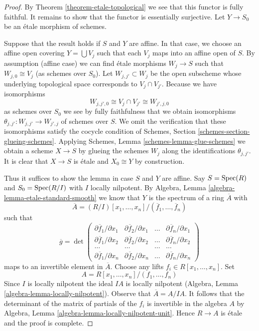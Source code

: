 \begin{proof}
By Theorem \ref{theorem-etale-topological}
we see that this functor is fully faithful.
It remains to show that the functor is essentially surjective.
Let $Y \to S_0$ be an \'etale morphism of schemes.

\medskip\noindent
Suppose that the result holds if $S$ and $Y$ are affine.
In that case, we choose an affine open covering
$Y = \bigcup V_j$ such that each $V_j$ maps
into an affine open of $S$. By assumption (affine case) we can
find \'etale morphisms $W_j \to S$ such that $W_{j, 0} \cong V_j$
(as schemes over $S_0$). Let $W_{j, j'} \subset W_j$
be the open subscheme whose underlying topological space
corresponds to $V_j \cap V_{j'}$. Because we have isomorphisms
$$
W_{j, j', 0} \cong V_j \cap V_{j'} \cong W_{j', j, 0}
$$
as schemes over $S_0$ we see by fully faithfulness that we
obtain isomorphisms
$\theta_{j, j'} : W_{j, j'} \to W_{j', j}$ of schemes over $S$.
We omit the verification that these isomorphisms satisfy the
cocycle condition of Schemes, Section \ref{schemes-section-glueing-schemes}.
Applying Schemes, Lemma \ref{schemes-lemma-glue-schemes}
we obtain a scheme $X \to S$ by
glueing the schemes $W_j$ along the identifications $\theta_{j, j'}$.
It is clear that $X \to S$ is \'etale and $X_0 \cong Y$ by construction.

\medskip\noindent
Thus it suffices to show the lemma in case $S$ and $Y$ are affine.
Say $S = \mathop{\mathrm{Spec}}(R)$ and $S_0 = \mathop{\mathrm{Spec}}(R/I)$ with $I$ locally nilpotent.
By Algebra, Lemma \ref{algebra-lemma-etale-standard-smooth} we know that
$Y$ is the spectrum of a ring $\overline{A}$ with
$$
\overline{A} = (R/I)[x_1, \ldots, x_n]/(\overline{f}_1, \ldots, \overline{f}_n)
$$
such that
$$
\overline{g} =
\det
\left(
\begin{matrix}
\partial \overline{f}_1/\partial x_1 &
\partial \overline{f}_2/\partial x_1 &
\ldots &
\partial \overline{f}_n/\partial x_1 \\
\partial \overline{f}_1/\partial x_2 &
\partial \overline{f}_2/\partial x_2 &
\ldots &
\partial \overline{f}_n/\partial x_2 \\
\ldots & \ldots & \ldots & \ldots \\
\partial \overline{f}_1/\partial x_n &
\partial \overline{f}_2/\partial x_n &
\ldots &
\partial \overline{f}_n/\partial x_n
\end{matrix}
\right)
$$
maps to an invertible element in $\overline{A}$. Choose any lifts
$f_i \in R[x_1, \ldots, x_n]$. Set
$$
A = R[x_1, \ldots, x_n]/(f_1, \ldots, f_n)
$$
Since $I$ is locally nilpotent the ideal $IA$ is locally nilpotent
(Algebra, Lemma \ref{algebra-lemma-locally-nilpotent}).
Observe that $\overline{A} = A/IA$.
It follows that the determinant of the matrix of partials of the
$f_i$ is invertible in the algebra $A$ by
Algebra, Lemma \ref{algebra-lemma-locally-nilpotent-unit}.
Hence $R \to A$ is \'etale and the proof is complete.
\end{proof}



